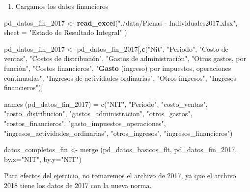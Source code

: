 \documentclass[
  11pt,
]{book}
\newenvironment{Shaded}{\begin{snugshade}}{\end{snugshade}}
\newcommand{\DataTypeTok}[1]{\textcolor[rgb]{0.13,0.29,0.53}{#1}}
\newcommand{\DecValTok}[1]{\textcolor[rgb]{0.00,0.00,0.81}{#1}}
\newcommand{\KeywordTok}[1]{\textcolor[rgb]{0.13,0.29,0.53}{\textbf{#1}}}
\newcommand{\NormalTok}[1]{#1}
\newcommand{\StringTok}[1]{\textcolor[rgb]{0.31,0.60,0.02}{#1}}
\providecommand{\tightlist}{%
  \setlength{\itemsep}{0pt}\setlength{\parskip}{0pt}}
\begin{document}
\begin{enumerate}
\def\labelenumi{\arabic{enumi}.}
\setcounter{enumi}{2}
\tightlist
\item
  Cargamos los datos financieros
\end{enumerate}

\begin{Shaded}
\begin{Highlighting}[]
\NormalTok{pd_datos_fin_}\DecValTok{2017}\NormalTok{ <-}\StringTok{ }\KeywordTok{read_excel}\NormalTok{(}\StringTok{"./data/Plenas - Individuales2017.xlsx"}\NormalTok{, }
                                \DataTypeTok{sheet =} \StringTok{"Estado de Resultado Integral"}\NormalTok{ )}

\NormalTok{pd_datos_fin_}\DecValTok{2017}\NormalTok{ <-}\StringTok{ }\NormalTok{pd_datos_fin_}\DecValTok{2017}\NormalTok{[,}\KeywordTok{c}\NormalTok{(}\StringTok{"Nit"}\NormalTok{, }\StringTok{"Periodo"}\NormalTok{, }\StringTok{"Costo de ventas"}\NormalTok{,  }
\StringTok{"Costos de distribución", "}\NormalTok{Gastos de administración", }\StringTok{"Otros gastos, por función",}
\StringTok{"}\NormalTok{Costos financieros}\StringTok{", "}\KeywordTok{Gasto}\NormalTok{ (ingreso) por impuestos, operaciones continuadas}\StringTok{",}
\StringTok{"}\NormalTok{Ingresos de actividades ordinarias}\StringTok{", "}\NormalTok{Otros ingresos}\StringTok{", "}\NormalTok{Ingresos financieros}\StringTok{")]}


\StringTok{names (pd_datos_fin_2017) = c("}\NormalTok{NIT}\StringTok{", "}\NormalTok{Periodo}\StringTok{", "}\NormalTok{costo_ventas}\StringTok{",  }
\StringTok{  "}\NormalTok{costo_distribucion}\StringTok{", "}\NormalTok{gastos_administracion}\StringTok{", "}\NormalTok{otros_gastos}\StringTok{", }
\StringTok{  "}\NormalTok{costos_financieros}\StringTok{", "}\NormalTok{gasto_impuestos_operaciones}\StringTok{", }
\StringTok{  "}\NormalTok{ingresos_actividades_ordinarias}\StringTok{", "}\NormalTok{otros_ingresos}\StringTok{", "}\NormalTok{ingresos_financieros}\StringTok{")}


\StringTok{datos_completos_fin <- merge (pd_datos_basicos_flt, pd_datos_fin_2017, }
\StringTok{                              by.x="}\NormalTok{NIT}\StringTok{", by.y="}\NormalTok{NIT}\StringTok{")}
\end{Highlighting}
\end{Shaded}

Para efectos del ejercicio, no tomaremos el archivo de 2017, ya que el
archivo 2018 tiene los datos de 2017 con la nueva norma.
\end{document}
